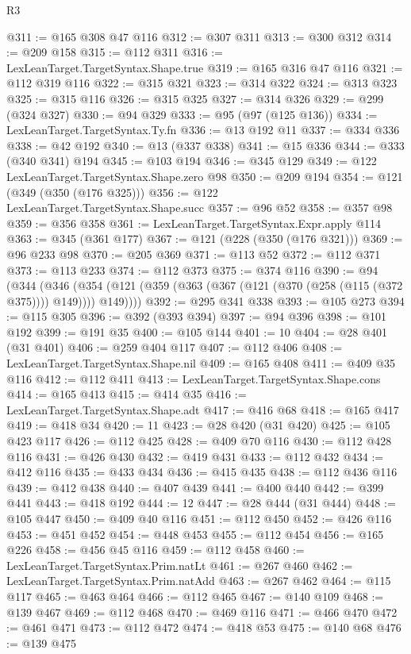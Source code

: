 \begin{lexlean}{R3}
\begin{coremodule}
@311 := @165 @308 @47 @116
@312 := @307 @311
@313 := @300 @312
@314 := @209 @158
@315 := @112 @311
@316 := LexLeanTarget.TargetSyntax.Shape.true
@319 := @165 @316 @47 @116
@321 := @112 @319 @116
@322 := @315 @321
@323 := @314 @322
@324 := @313 @323
@325 := @315 @116
@326 := @315 @325
@327 := @314 @326
@329 := @299 (@324 @327)
@330 := @94 @329
@333 := @95 (@97 (@125 @136))
@334 := LexLeanTarget.TargetSyntax.Ty.fn
@336 := @13 @192 @11
@337 := @334 @336
@338 := @42 @192
@340 := @13 (@337 @338)
@341 := @15 @336
@344 := @333 (@340 @341) @194
@345 := @103 @194
@346 := @345 @129
@349 := @122 LexLeanTarget.TargetSyntax.Shape.zero @98
@350 := @209 @194
@354 := @121 (@349 (@350 (@176 @325)))
@356 := @122 LexLeanTarget.TargetSyntax.Shape.succ
@357 := @96 @52
@358 := @357 @98
@359 := @356 @358
@361 := LexLeanTarget.TargetSyntax.Expr.apply @114
@363 := @345 (@361 @177)
@367 := @121 (@228 (@350 (@176 @321)))
@369 := @96 @233 @98
@370 := @205 @369
@371 := @113 @52
@372 := @112 @371
@373 := @113 @233
@374 := @112 @373
@375 := @374 @116
@390 := @94
    (@344
      (@346 (@354 (@121 (@359 (@363 (@367 (@121 (@370 (@258 (@115 (@372 @375)))) @149)))) @149))))
@392 := @295 @341 @338
@393 := @105 @273
@394 := @115 @305
@396 := @392 (@393 @394)
@397 := @94 @396
@398 := @101 @192
@399 := @191 @35
@400 := @105 @144
@401 := 10
@404 := @28 @401 (@31 @401)
@406 := @259 @404 @117
@407 := @112 @406
@408 := LexLeanTarget.TargetSyntax.Shape.nil
@409 := @165 @408
@411 := @409 @35 @116
@412 := @112 @411
@413 := LexLeanTarget.TargetSyntax.Shape.cons
@414 := @165 @413
@415 := @414 @35
@416 := LexLeanTarget.TargetSyntax.Shape.adt
@417 := @416 @68
@418 := @165 @417
@419 := @418 @34
@420 := 11
@423 := @28 @420 (@31 @420)
@425 := @105 @423 @117
@426 := @112 @425
@428 := @409 @70 @116
@430 := @112 @428 @116
@431 := @426 @430
@432 := @419 @431
@433 := @112 @432
@434 := @412 @116
@435 := @433 @434
@436 := @415 @435
@438 := @112 @436 @116
@439 := @412 @438
@440 := @407 @439
@441 := @400 @440
@442 := @399 @441
@443 := @418 @192
@444 := 12
@447 := @28 @444 (@31 @444)
@448 := @105 @447
@450 := @409 @40 @116
@451 := @112 @450
@452 := @426 @116
@453 := @451 @452
@454 := @448 @453
@455 := @112 @454
@456 := @165 @226
@458 := @456 @45 @116
@459 := @112 @458
@460 := LexLeanTarget.TargetSyntax.Prim.natLt
@461 := @267 @460
@462 := LexLeanTarget.TargetSyntax.Prim.natAdd
@463 := @267 @462
@464 := @115 @117
@465 := @463 @464
@466 := @112 @465
@467 := @140 @109
@468 := @139 @467
@469 := @112 @468
@470 := @469 @116
@471 := @466 @470
@472 := @461 @471
@473 := @112 @472
@474 := @418 @53
@475 := @140 @68
@476 := @139 @475

\end{coremodule}
\end{lexlean}
